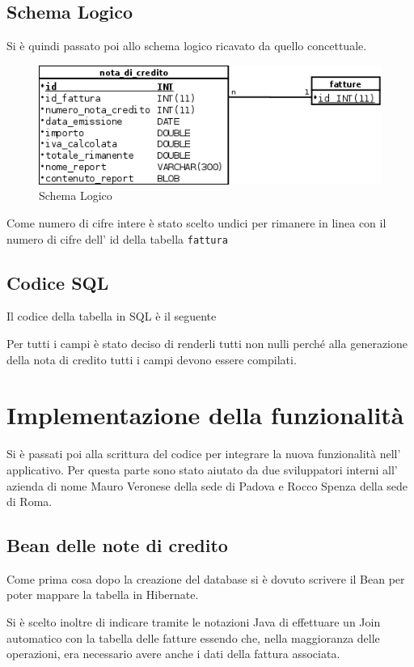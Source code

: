 \documentclass[12pt]{book}
\begin{document}
\subsection{Schema Logico}
Si è quindi passato poi allo schema logico ricavato da quello concettuale.
\begin{figure}[H]
    \centering
    \includegraphics[scale=0.5]{img/schema_logico}
    \caption{Schema Logico}\label{schema:logico}
\end{figure}
Come numero di cifre intere è stato scelto undici per rimanere in linea con il
numero di cifre dell' id della tabella \texttt{fattura}
\subsection{Codice SQL}
Il codice della tabella in SQL è il seguente

Per tutti i campi è stato deciso di renderli tutti non nulli perché alla
generazione della nota di credito tutti i campi devono essere compilati.
\section{Implementazione della funzionalità}
Si è passati poi alla scrittura del codice per integrare la nuova funzionalità
nell' applicativo.
Per questa parte sono stato aiutato da due sviluppatori interni all' azienda
di nome Mauro Veronese della sede di Padova e Rocco Spenza della sede di Roma.
\subsection{Bean delle note di credito}
Come prima cosa dopo la creazione del database si è dovuto scrivere il Bean per 
poter mappare la tabella in Hibernate.

Si è scelto inoltre di indicare tramite le notazioni Java di effettuare un Join
automatico con la tabella delle fatture essendo che, nella maggioranza delle 
operazioni, era necessario avere anche i dati della fattura associata.
\end{document}
